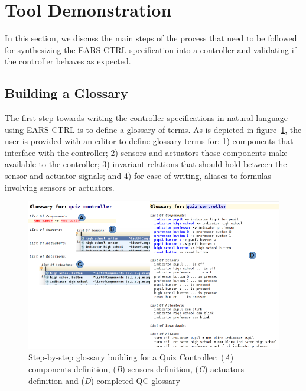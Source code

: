\vspace{-.5cm}
\section{Tool Demonstration}
\label{sec:demo}
\vspace{-.3cm}
In this section, we discuss the main steps of the process that need to be
followed for synthesizing the EARS-CTRL specification into a controller and
validating if the controller behaves as expected.
\vspace{-.3cm}
\subsection{Building a Glossary}
\vspace{-.2cm}
The first step towards writing the controller specifications in natural
language using \textsf{EARS-CTRL} is to define a glossary of terms. 
As is depicted in figure~\ref{fig:glossary_def}, the user is provided with an
editor to define glossary terms for: 1) components that interface with the
controller; 2) sensors and actuators those components make available to the controller; 3) invariant relations
that should hold between the sensor and actuator signals; and 4) for ease of
writing, aliases to formulas involving sensors or actuators.
\vspace{-.2cm}
\begin{figure}[!h]
\centering
\includegraphics[width=1\textwidth]{./images/QC_Glossary_Def.png}
\caption{Step-by-step glossary building for a Quiz Controller: (\emph{A})
components definition, (\emph{B}) sensors definition, (\emph{C}) actuators
definition and (\emph{D}) completed QC glossary}
\label{fig:glossary_def}
\vspace{-.6cm}
\end{figure}
